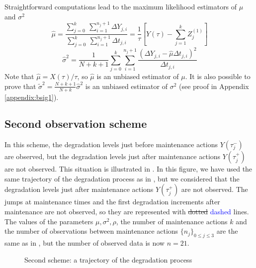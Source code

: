 \noindent Straightforward  computations lead to the maximum likelihood estimators of $\mu$ and $\sigma^2$ 
\begin{equation}
\hat{\mu}=\frac{\sum \limits_{j=0}^{k}\ \sum\limits_{i=1}^{n_j+1} \Delta Y_{j,i}}{\sum \limits_{j=0}^{k}\ \sum\limits_{i=1}^{n_j+1} \Delta t_{j,i}} = \frac{1}{\tau} \left[Y(\tau)-\sum\limits_{j=1}^{k} Z_j^{(1)}\right]
\end{equation}
\begin{equation}
\hat{\sigma}^2=\frac{1}{{N+k+1}}\sum \limits_{j=0}^{k}\sum\limits_{i=1}^{n_j+1} \frac{\displaystyle(\Delta Y_{j,i}-\hat{\mu}\Delta t_{j,i})^2}{ \displaystyle \Delta t_{j,i}}
\label{eq:sigma2_cas1}
\end{equation}
\noindent Note that $\hat{\mu} = X(\tau)/\tau$, so $\hat{\mu}$ is an unbiased estimator of $\mu$.
It is also possible to prove that $\tilde{\sigma}^2={\displaystyle\frac{N+k+1}{N+k}}\hat{\sigma}^2 $ is an unbiased estimator of $\sigma^2$ (see proof in Appendix \ref{appendix:bsig1}). 


\subsection{Second observation scheme}
\label{2case}

In this scheme, the degradation levels just before maintenance actions $Y(\tau_j^-)$ are observed, but the degradation levels just after maintenance actions $Y(\tau_j^+)$ are not observed. This situation is illustrated in . In this figure, we have used the same trajectory of the degradation process as in , but we considered that the degradation levels just after maintenance actions $Y(\tau_j^+)$ are not observed. The jumps at maintenance times and the first degradation increments after maintenance are not observed, so they are represented with \st{dotted} \textcolor{blue}{dashed} lines. The values of the parameters $\mu, \sigma^2,\rho$, the number of maintenance actions $k$ and the number of observations between maintenance actions $\{n_j\}_{0 \leq j \leq 3}$ are the same as in , but the number of observed data is now $n=21$.

\begin{figure}[htbp]
\caption{Second scheme: a trajectory of the degradation process}
\label{fig:cas2}
\end{figure}

